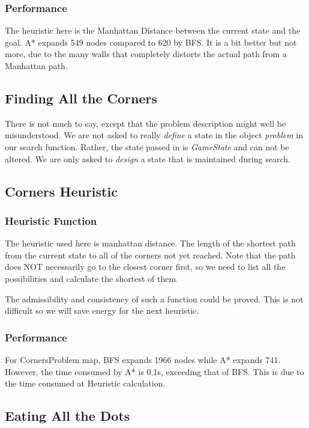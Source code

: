 \documentclass{article}
\begin{document}
    \subsubsection{Performance}
      The heuristic here is the Manhattan Distance between the current state and the goal. A* expands 549 nodes compared to 620 by BFS. It is a bit better but not more, due to the many walls that completely distorts the actual path from a Manhattan path.
  \subsection{Finding All the Corners}
  There is not much to say, except that the problem description might well be misunderstood. We are not asked to really \emph{define} a state in the object \textit{problem} in our search function. Rather, the state passed in is \textit{GameState} and can not be altered. We are only asked to \emph{design} a state that is maintained during search.
  \subsection{Corners Heuristic}
    \subsubsection{Heuristic Function}
    The heuristic used here is manhattan distance. The length of the shortest path from the current state to all of the corners not yet reached. Note that the path does NOT necessarily go to the closest corner first, so we need to list all the possibilities and calculate the shortest of them.\par
    The admissibility and consistency of such a function could be proved. This is not difficult so we will save energy for the next heuristic.
    \subsubsection{Performance}
    For CornersProblem map, BFS expands 1966 nodes while A* expands 741. However, the time consumed by A* is 0.1s, exceeding that of BFS. This is due to the time consumed at Heuristic calculation.
  \subsection{Eating All the Dots}
\end{document}
